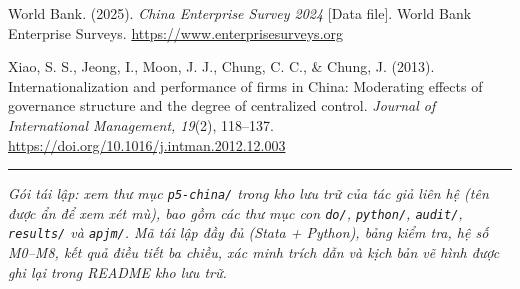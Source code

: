 \documentclass[12pt,a4paper]{article}
\begin{document}
World Bank. (2025). \emph{China Enterprise Survey 2024} {[}Data file{]}.
World Bank Enterprise Surveys. \url{https://www.enterprisesurveys.org}

Xiao, S. S., Jeong, I., Moon, J. J., Chung, C. C., \& Chung, J. (2013).
Internationalization and performance of firms in China: Moderating
effects of governance structure and the degree of centralized control.
\emph{Journal of International Management, 19}(2), 118--137.
\url{https://doi.org/10.1016/j.intman.2012.12.003}

\begin{center}\rule{0.5\linewidth}{0.5pt}\end{center}

\emph{Gói tái lập: xem thư mục \texttt{p5-china/} trong kho lưu trữ của
tác giả liên hệ (tên được ẩn để xem xét mù), bao gồm các thư mục con
\texttt{do/}, \texttt{python/}, \texttt{audit/}, \texttt{results/} và
\texttt{apjm/}. Mã tái lập đầy đủ (Stata + Python), bảng kiểm tra, hệ số
M0--M8, kết quả điều tiết ba chiều, xác minh trích dẫn và kịch bản vẽ
hình được ghi lại trong README kho lưu trữ.}
\end{document}
